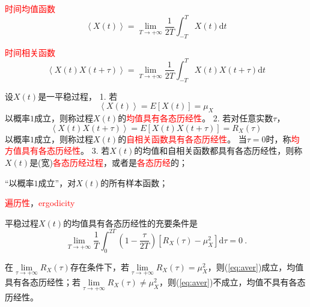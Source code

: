 \documentclass[12pt,a4paper]{article}
\newcommand{\dif}{\mathrm{d}}
\begin{document}
\textcolor{red}{时间均值函数}
\begin{equation}
\left\langle X(t) \right\rangle = \lim_{T\rightarrow +\infty} \frac{1}{2T} \int_{-T}^{T} X(t) \dif t
\end{equation}

\textcolor{red}{时间相关函数}
\begin{equation}
\left\langle X(t) X(t+\tau) \right\rangle = \lim_{T\rightarrow +\infty} \frac{1}{2T} \int_{-T}^{T} X(t) X(t+\tau)  \dif t
\end{equation}

设$X(t)$是一平稳过程，
1. 若
\begin{equation}
\left\langle X(t) \right\rangle = E[X(t)] = \mu_X
\end{equation}
以概率$1$成立，则称过程$X(t)$的\textcolor{red}{均值具有各态历经性}。
2. 若对任意实数$\tau$，
\begin{equation}
\left\langle X(t) X(t+\tau) \right\rangle = E[X(t)X(t+\tau)] = R_X(\tau)
\end{equation}
以概率$1$成立，则称过程$X(t)$的\textcolor{red}{自相关函数具有各态历经性}。
当$\tau = 0$时，称\textcolor{red}{均方值具有各态历经性}。
3. 若$X(t)$的均值和自相关函数都具有各态历经性，则称$X(t)$是(宽)\textcolor{red}{各态历经过程}，或者是\textcolor{red}{各态历经}的；

“以概率$1$成立”，对$X(t)$的所有样本函数；

\textcolor{red}{遍历性}，\textcolor{red}{ergodicity}



\begin{tcolorbox}[colback=green!5,colframe=green!40!black,title= 均值各态历经定理]
平稳过程$X(t)$的均值具有各态历经性的充要条件是
\begin{equation}
\lim_{T\rightarrow +\infty} \dfrac{1}{T} \int_0^{2T} \left( 1-\dfrac{\tau}{2T} \right) [R_X(\tau) - \mu_X^2 ] \dif \tau = 0 ~.
\label{eq:aver}
\end{equation}
\end{tcolorbox}




\begin{tcolorbox}[colback=green!5,colframe=green!40!black,title= 推论]
在$\lim\limits_{\tau \rightarrow +\infty} R_X(\tau)$存在条件下，若$\lim\limits_{\tau \rightarrow +\infty} R_X(\tau) = \mu_X^2$，则(\ref{eq:aver})成立，均值具有各态历经性；若$\lim\limits_{\tau \rightarrow +\infty} R_X(\tau) \neq \mu_X^2$，则(\ref{eq:aver})不成立，均值不具有各态历经性。
\end{tcolorbox}
\end{document}
